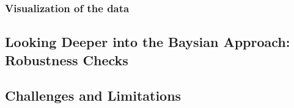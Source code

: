 \subsubsection*{Visualization of the data}



\subsection{Looking Deeper into the Baysian Approach: Robustness Checks}

\subsection{Challenges and Limitations}






